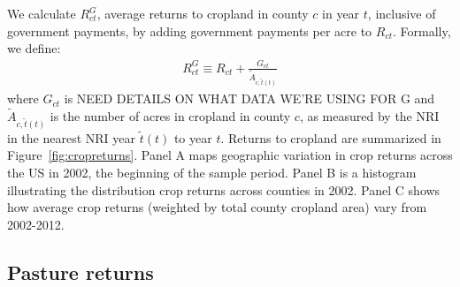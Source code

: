 \documentclass[11pt]{article}
\begin{document}
We calculate $R^G_{ct}$, average returns to cropland in county $c$ in year $t$, inclusive of government payments, by adding government payments per acre to $R_{ct}$. Formally, we define:
\begin{align}
R^G_{ct} \equiv R_{ct} + \frac{G_{ct}}{\tilde{A}_{c,\tilde{t}(t)}}
\end{align}
where $G_{ct}$ is NEED DETAILS ON WHAT DATA WE'RE USING FOR G and $\tilde{A}_{c,\tilde{t}(t)}$ is the number of acres in cropland in county $c$, as measured by the NRI in the nearest NRI year $\tilde{t}(t)$ to year $t$. Returns to cropland are summarized in Figure~\ref{fig:cropreturns}. Panel A maps geographic variation in crop returns across the US in 2002, the beginning of the sample period. Panel B is a histogram illustrating the distribution crop returns across counties in 2002. Panel C shows how average crop returns (weighted by total county cropland area) vary from 2002-2012.


\subsection{Pasture returns}
\end{document}
